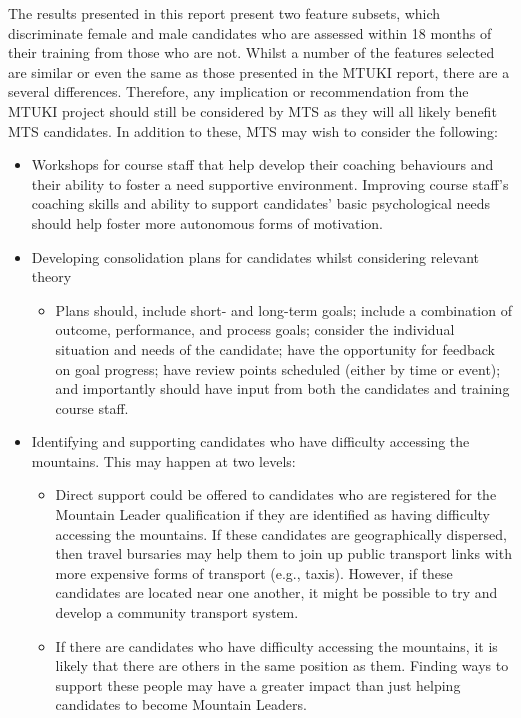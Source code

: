 \documentclass[
  12pt,
  a4paper,
]{book}
\providecommand{\tightlist}{%
  \setlength{\itemsep}{0pt}\setlength{\parskip}{0pt}}
\begin{document}
The results presented in this report present two feature subsets, which discriminate female and male candidates who are assessed within 18 months of their training from those who are not. Whilst a number of the features selected are similar or even the same as those presented in the MTUKI report, there are a several differences. Therefore, any implication or recommendation from the MTUKI project should still be considered by MTS as they will all likely benefit MTS candidates. In addition to these, MTS may wish to consider the following:

\begin{itemize}
\tightlist
\item
  Workshops for course staff that help develop their coaching behaviours and their ability to foster a need supportive environment. Improving course staff's coaching skills and ability to support candidates' basic psychological needs should help foster more autonomous forms of motivation.
\item
  Developing consolidation plans for candidates whilst considering relevant theory

  \begin{itemize}
  \tightlist
  \item
    Plans should, include short- and long-term goals; include a combination of outcome, performance, and process goals; consider the individual situation and needs of the candidate; have the opportunity for feedback on goal progress; have review points scheduled (either by time or event); and importantly should have input from both the candidates and training course staff.
  \end{itemize}
\item
  Identifying and supporting candidates who have difficulty accessing the mountains. This may happen at two levels:

  \begin{itemize}
  \tightlist
  \item
    Direct support could be offered to candidates who are registered for the Mountain Leader qualification if they are identified as having difficulty accessing the mountains. If these candidates are geographically dispersed, then travel bursaries may help them to join up public transport links with more expensive forms of transport (e.g., taxis). However, if these candidates are located near one another, it might be possible to try and develop a community transport system.
  \item
    If there are candidates who have difficulty accessing the mountains, it is likely that there are others in the same position as them. Finding ways to support these people may have a greater impact than just helping candidates to become Mountain Leaders.
  \end{itemize}
\end{itemize}
\end{document}
